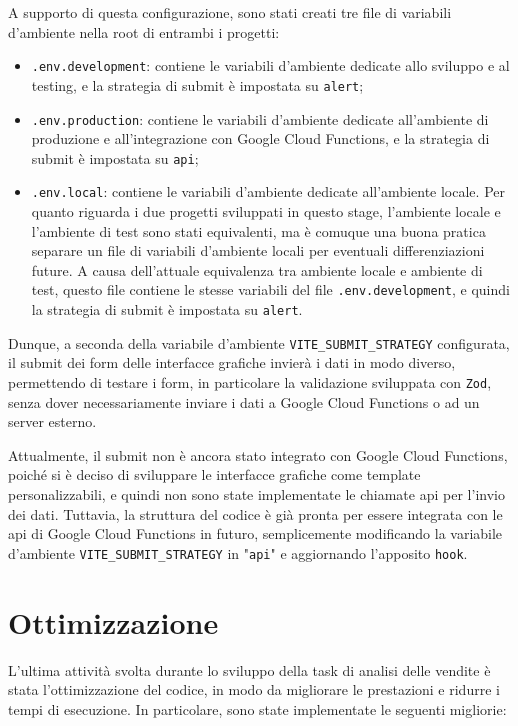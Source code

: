 A supporto di questa configurazione, sono stati creati tre file di variabili d'ambiente nella root di entrambi i progetti:
\begin{itemize}
    \item \texttt{.env.development}: contiene le variabili d'ambiente dedicate allo sviluppo e al testing, e la strategia di submit è impostata su \texttt{alert};
    \item \texttt{.env.production}: contiene le variabili d'ambiente dedicate all'ambiente di produzione e all'integrazione con Google Cloud Functions, e la strategia di submit è impostata su \texttt{api};
    \item \texttt{.env.local}: contiene le variabili d'ambiente dedicate all'ambiente locale. Per quanto riguarda i due progetti sviluppati in questo stage, l'ambiente locale e l'ambiente di test sono stati equivalenti, ma è comuque una buona pratica separare un file di variabili d'ambiente locali per eventuali differenziazioni future. A causa dell'attuale equivalenza tra ambiente locale e ambiente di test, questo file contiene le stesse variabili del file \texttt{.env.development}, e quindi la strategia di submit è impostata su \texttt{alert}.
\end{itemize}

Dunque, a seconda della variabile d'ambiente \texttt{VITE\_SUBMIT\_STRATEGY} configurata, il submit dei form delle interfacce grafiche invierà i dati in modo diverso, permettendo di testare i form, in particolare la validazione sviluppata con \texttt{Zod}, senza dover necessariamente inviare i dati a Google Cloud Functions o ad un server esterno.

Attualmente, il submit non è ancora stato integrato con Google Cloud Functions, poiché si è deciso di sviluppare le interfacce grafiche come template personalizzabili, e quindi non sono state implementate le chiamate \gls{api} per l'invio dei dati. Tuttavia, la struttura del codice è già pronta per essere integrata con le \gls{api} di Google Cloud Functions in futuro, semplicemente modificando la variabile d'ambiente \texttt{VITE\_SUBMIT\_STRATEGY} in "\texttt{api}" e aggiornando l'apposito \texttt{hook}.



\section{Ottimizzazione}

L'ultima attività svolta durante lo sviluppo della task di analisi delle vendite è stata l'ottimizzazione del codice, in modo da migliorare le prestazioni e ridurre i tempi di esecuzione. In particolare, sono state implementate le seguenti migliorie:

